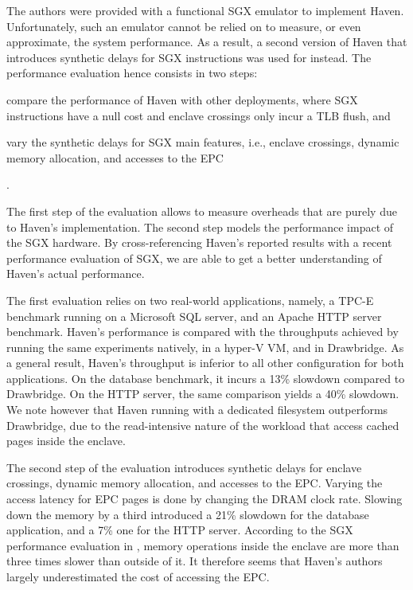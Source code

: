 The authors were provided with a functional SGX emulator to implement Haven.
Unfortunately, such an emulator cannot be relied on to measure, or even approximate, the system performance.
As a result, a second version of Haven that introduces synthetic delays for SGX instructions was used for instead.
The performance evaluation hence consists in two steps:
\begin{enumerate*}
	\item compare the performance of Haven with other deployments, where SGX instructions have a null cost and enclave crossings only incur a TLB flush, and
	\item vary the synthetic delays for SGX main features, i.e., enclave crossings, dynamic memory allocation, and accesses to the EPC
\end{enumerate*}.

The first step of the evaluation allows to measure overheads that are purely due to Haven's implementation.
The second step models the performance impact of the SGX hardware.
By cross-referencing Haven's reported results with a recent performance evaluation of SGX\cite{DBLP:conf/IEEEwisa/ZhaoSTZX16}, we are able to get a better understanding of Haven's actual performance.

The first evaluation relies on two real-world applications, namely, a TPC-E benchmark running on a Microsoft SQL server, and an Apache HTTP server benchmark.
Haven's performance is compared with the throughputs achieved by running the same experiments natively, in a hyper-V VM, and in Drawbridge.
As a general result, Haven's throughput is inferior to all other configuration for both applications.
On the database benchmark, it incurs a 13\% slowdown compared to Drawbridge.
On the HTTP server, the same comparison yields a 40\% slowdown.
We note however that Haven running with a dedicated filesystem outperforms Drawbridge, due to the read-intensive nature of the workload that access cached pages inside the enclave.

The second step of the evaluation introduces synthetic delays for enclave crossings, dynamic memory allocation, and accesses to the EPC.
Varying the access latency for EPC pages is done by changing the DRAM clock rate.
Slowing down the memory by a third introduced a 21\% slowdown for the database application, and a 7\% one for the HTTP server.
According to the SGX performance evaluation in \cite{DBLP:conf/IEEEwisa/ZhaoSTZX16}, memory operations inside the enclave are more than three times slower than outside of it.
It therefore seems that Haven's authors largely underestimated the cost of accessing the EPC.

